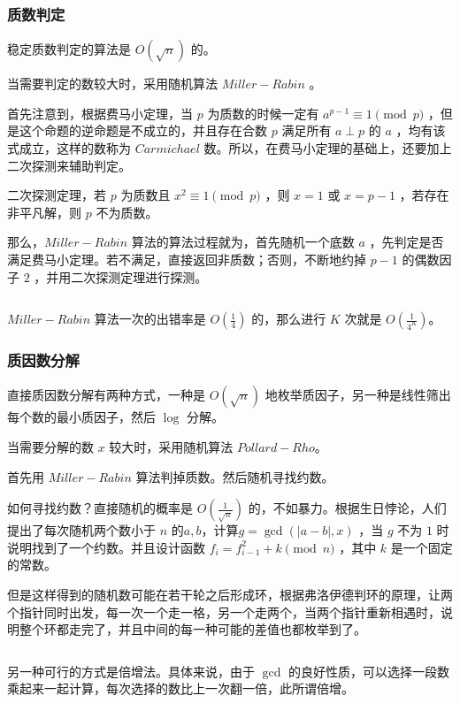 \documentclass[UTF-8]{ctexart}
\newcommand{\cpp}[1]{\inputminted[bgcolor=bg,breaklines,breakanywhere=true]{c++}{#1}}
\begin{document}
			\cpp{code//Math//priroot.cpp}
			\subsubsection{质数判定}
			稳定质数判定的算法是 $O(\sqrt{n})$ 的。

			当需要判定的数较大时，采用随机算法 $Miller-Rabin$ 。

			首先注意到，根据费马小定理，当 $p$ 为质数的时候一定有 $a^{p-1} \equiv 1 \pmod{p}$ ，但是这个命题的逆命题是不成立的，并且存在合数 $p$ 满足所有 $a \perp p$ 的 $a$ ，均有该式成立，这样的数称为 $Carmichael$ 数。所以，在费马小定理的基础上，还要加上二次探测来辅助判定。

			二次探测定理，若 $p$ 为质数且 $x^2 \equiv 1 \pmod{p}$ ，则 $x=1$ 或 $x=p-1$ ，若存在非平凡解，则 $p$ 不为质数。

			那么，$Miller-Rabin$ 算法的算法过程就为，首先随机一个底数 $a$ ，先判定是否满足费马小定理。若不满足，直接返回非质数；否则，不断地约掉 $p-1$ 的偶数因子 $2$ ，并用二次探测定理进行探测。
			
			\cpp{code//Math//millerrabin.cpp}

			$Miller-Rabin$ 算法一次的出错率是 $O(\frac{1}{4})$ 的，那么进行 $K$ 次就是 $O(\frac{1}{4^K})$。
			\subsubsection{质因数分解}
			直接质因数分解有两种方式，一种是 $O(\sqrt{n})$ 地枚举质因子，另一种是线性筛出每个数的最小质因子，然后 $\log$ 分解。

			当需要分解的数 $x$ 较大时，采用随机算法 $Pollard-Rho$。

			首先用 $Miller-Rabin$ 算法判掉质数。然后随机寻找约数。

			如何寻找约数？直接随机的概率是 $O(\frac{1}{\sqrt{n}})$ 的，不如暴力。根据生日悖论，人们提出了每次随机两个数小于 $n$ 的$a,b$，计算$g=\gcd(|a-b|,x)$ ，当 $g$ 不为 $1$ 时说明找到了一个约数。并且设计函数 $f_i=f_{i-1}^2+k \pmod{n}$ ，其中 $k$ 是一个固定的常数。

			但是这样得到的随机数可能在若干轮之后形成环，根据弗洛伊德判环的原理，让两个指针同时出发，每一次一个走一格，另一个走两个，当两个指针重新相遇时，说明整个环都走完了，并且中间的每一种可能的差值也都枚举到了。
			
			\cpp{code//Math//pollardrho-floyed.cpp}
			
			另一种可行的方式是倍增法。具体来说，由于 $\gcd$ 的良好性质，可以选择一段数乘起来一起计算，每次选择的数比上一次翻一倍，此所谓倍增。
			
\end{document}
